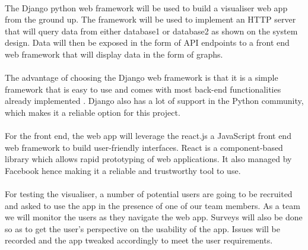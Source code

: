 \paragraph{}
The  Django python web framework will be used to build a visualiser web app from the ground up. The framework will be used to implement an HTTP server that will query data from either database1 or database2 as shown on the system design. Data will then be exposed in the form of API endpoints to a front end web framework that will display data in the form of graphs.
\paragraph{}
The advantage of choosing the Django web framework is that it is a simple framework that is easy to use and comes with most back-end functionalities already implemented \cite{10.1007/978-3-540-87403-4_11}. Django also has a lot of support in the Python community, which makes it a reliable option for this project.
\paragraph{}
For the front end, the web app will leverage the react.js a JavaScript front end web framework to build user-friendly interfaces. React is a component-based library which allows rapid prototyping of web applications\cite{Gackenheimer2015}. It also managed by Facebook hence making it a reliable and trustworthy tool to use.
\paragraph{}
For testing the visualiser, a number of potential users are going to be recruited and asked to use the app in the presence of one of our team members. As a team we will monitor the users as they navigate the web app. Surveys will also be done so as to get the user's perspective on the usability of the app. Issues will be recorded and the app tweaked accordingly to meet the user requirements.
